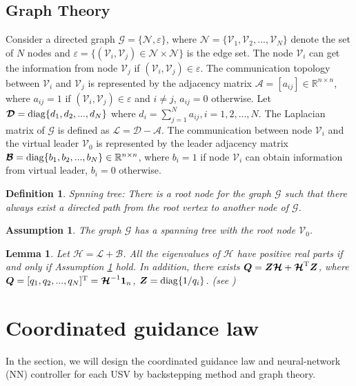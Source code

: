 \documentclass[a4paper,fleqn]{cas-dc}
\newtheorem{definition}{Definition}
\newtheorem{lemma}{Lemma}
\newtheorem{assumption}{Assumption}
\begin{document}
\subsection{Graph Theory}

Consider a directed graph $\mathcal{G}=\{\mathcal{N},\varepsilon\}$, where $\mathcal{N}=\{\mathcal{V}_1,\mathcal{V}_2,...,\mathcal{V}_N\}$ denote the set of $N$ nodes and $\varepsilon=\{(\mathcal{V}_i,\mathcal{V}_j)\in \mathcal{N}\times \mathcal{N}\}$ is the edge set. The node $\mathcal{V}_i$ can get the information from node $\mathcal{V}_j$ if $(\mathcal{V}_i,\mathcal{V}_j)\in \varepsilon$. The communication topology between $\mathcal{V}_i$ and $\mathcal{V}_j$ is represented by the adjacency matrix $\bm{\mathcal{A}}=[a_{ij}]\in \mathbb{R}^{n\times n}$, where $a_{ij}=1$ if $(\mathcal{V}_i,\mathcal{V}_j)\in \varepsilon$ and $i\neq j$, $a_{ij}=0$ otherwise. Let $\bm{\mathcal{D}}={\rm diag}\{d_1,d_2,...,d_N\}$ where $d_i=\sum^N_{j=1}a_{ij},i=1,2,...,N$. The Laplacian matrix of $\mathcal{G}$ is defined as $\bm{\mathcal{L}}=\bm{\mathcal{D}}-\bm{\mathcal{A}}$. The communication between node $\mathcal{V}_i$ and the virtual leader $\mathcal{V}_0$ is represented by the leader adjacency matrix $\bm{\mathcal{B}}={\rm diag}\{b_1,b_2,...,b_N\}\in \mathbb{R}^{n\times n}$, where $b_i=1$ if node $\mathcal{V}_i$ can obtain information from virtual leader, $b_i=0$ otherwise. 

\begin{definition}
	Spnning tree: There is a root node for the graph $\mathcal{G}$ such that there always exist a directed path from the root vertex to another node of $\mathcal{G}$.  
\end{definition}

\begin{assumption}\label{assumption}
	The graph $\mathcal{G}$ has a spanning tree with the root node $\mathcal{V}_0$.
\end{assumption}

\begin{lemma}\label{lemma}
	Let $\bm{\mathcal{H}}=\bm{\mathcal{L}}+\bm{\mathcal{B}}$. All the eigenvalues of $\bm{\mathcal{H}}$ have positive real parts if and only if Assumption \ref{assumption} hold. In addition, there exists $\bm{Q}=\bm{Z}\bm{\mathcal{H}}+\bm{\mathcal{H}}^{\rm T}\bm{Z}$, where $\bm{Q}=[q_1,q_2,...,q_N]^{\rm T}=\bm{\mathcal{H}}^{-1}\bm{1}_n$, $\bm{Z}={\rm diag}\{1/q_i\}$. {\rm (see \cite{bib14,bib15})}
\end{lemma} 

\section{Coordinated guidance law}
In the section, we will design the coordinated guidance law and neural-network (NN) controller for each USV by backstepping method and graph theory.
\end{document}
